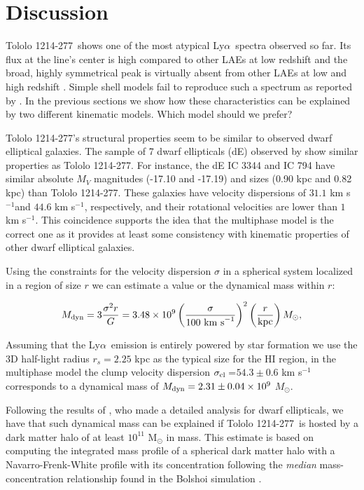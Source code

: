 \documentclass[a4,useAMS,usenatbib,usegraphicx]{mn2e}
\newcommand{\tol}{Tololo 1214-277}
\newcommand{\lya}{Ly$\alpha$}
\newcommand{\kms}{km s$^{-1}$}
\newcommand{\sigmaclump}{$54.3\pm 0.6$ km s$^{-1}$}
\begin{document}
\section{Discussion}

\tol\ shows one of the most atypical \lya\ spectra observed so far.
Its flux at the line's center is high compared to other LAEs at low
redshift and the broad, highly symmetrical peak is virtually absent from other
LAEs at low and high redshift
\citep{2012ApJ...751...29Y,LARS,Erb14,Trainor16}. 
Simple shell models
fail to reproduce such a spectrum as reported by \cite{2015A&A...578A...7V}.  
In the previous sections we show how these characteristics can be
explained by two different kinematic models. Which model should we prefer?

\tol's structural properties seem to be similar to observed dwarf
elliptical galaxies. 
The sample of 7 dwarf ellipticals (dE) observed by
\cite{2003AJ....126.1794G} show similar properties as \tol. 
For instance, the dE IC 3344 and IC 794 have similar absolute $M_V$
magnitudes (-17.10 and -17.19) and sizes (0.90 kpc and 0.82 kpc) than
\tol. These galaxies have velocity dispersions of $31.1$ \kms and
$44.6$ \kms, respectively,  and their rotational velocities are lower
than $1$\kms.  
This coincidence supports the idea that the multiphase model is
the correct one as it provides at least some consistency with
kinematic properties of other dwarf elliptical galaxies.

Using the constraints for the velocity dispersion $\sigma$  in a
spherical system localized in a region of size $r$ we can estimate a
value or the dynamical mass within $r$: 

\begin{equation}
M_{\rm dyn} = 3 \frac{\sigma ^{2}r}{G} = 3.48\times10^{9}
\left(\frac{\sigma}{100\ \mathrm{km\ s}^{-1}}\right)^2\left(\frac{r}{\mathrm{kpc}}\right)
M_{\odot}, 
\end{equation}

Assuming that the \lya\ emission is entirely powered by star formation 
we use the 3D half-light radius $r_s=2.25$ kpc as the typical size
for the HI region, in the multiphase model the clump velocity dispersion
$\sigma_{\rm{cl}}=$\sigmaclump corresponds to a dynamical mass of
$M_{\rm dyn}=2.31\pm0.04 \times 10^{9}$ $M_{\odot}$. 

Following the results of \cite{2011ApJ...726..108T}, who made a
detailed analysis for dwarf ellipticals, we have that such dynamical
mass can be explained if \tol\ is hosted by a dark matter halo of at
least $10^{11}$ M$_{\odot}$ in mass. 
This estimate is based on computing the integrated mass profile of a
spherical dark matter halo with a Navarro-Frenk-White profile with its
concentration following the \emph{median} mass-concentration
relationship found in the Bolshoi simulation \citep{2012MNRAS.423.3018P}. 
\end{document}
